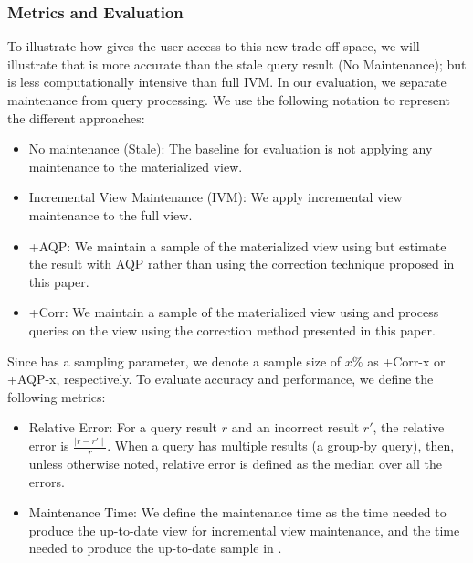 \subsubsection{Metrics and Evaluation}
To illustrate how \svc gives the user access to this new trade-off space, we will illustrate that \svc is more accurate than the stale query result (No Maintenance); but is less computationally intensive than full IVM. 
In our evaluation, we separate maintenance from query processing.
We use the following notation to represent the different approaches:
\vspace{-.25em}
\begin{itemize}[noitemsep]
\item No maintenance (Stale): The baseline for evaluation is not applying any maintenance to the materialized view.
\item Incremental View Maintenance (IVM): We apply incremental view maintenance to the full view.
\item \svcnospace+AQP: We maintain a sample of the materialized view using \svc but estimate the result with AQP rather than using 
the correction technique proposed in this paper.
\item \svcnospace+Corr: We maintain a sample of the materialized view using \svc and process queries on the view using the correction method presented in this paper.
\end{itemize}
\vspace{-.25em}
Since \svc has a sampling parameter, we denote a sample size of $x \% $ as \svcnospace+Corr-x or \svcnospace+AQP-x, respectively. 
To evaluate accuracy and performance, we define the following metrics:
\begin{itemize}[noitemsep]
\item Relative Error: For a query result $r$ and an incorrect result $r'$, the relative error is $\frac{\mid r-r' \mid}{r}.$
When a query has multiple results (a group-by query), then, unless otherwise noted, relative error is defined as the median over all the errors.
\item Maintenance Time: We define the maintenance time as the time needed to produce the up-to-date view for incremental view maintenance, and the time needed to produce the up-to-date sample in \svc. 
\end{itemize}

